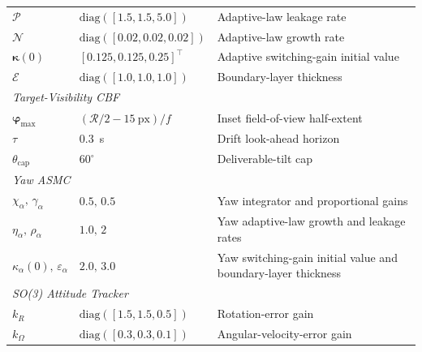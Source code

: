 \documentclass{IEEEtaes}
\begin{document}
\begin{table}[!t]
\begin{tabular}{p{} p{} p{}}
        $\mathcal{P}$           & $\text{diag}([1.5,1.5,5.0])$ & Adaptive-law leakage rate \\
        $\mathcal{N}$           & $\text{diag}([0.02,0.02,0.02])$ & Adaptive-law growth rate \\
        $\boldsymbol{\kappa}(0)$ & $[0.125,0.125,0.25]^\top$ & Adaptive switching-gain initial value \\
        $\mathcal{E}$           & $\text{diag}([1.0,1.0,1.0])$ & Boundary-layer thickness \\
    \midrule
        \multicolumn{3}{l}{\textit{Target-Visibility CBF}} \\
        $\boldsymbol{\varphi}_\text{max}$ & $(\mathcal{R}/2-15~\text{px})/f$ & Inset field-of-view half-extent \\
        $\tau$                      & $0.3$~s & Drift look-ahead horizon \\
        $\theta_\text{cap}$         & $60^\circ$ & Deliverable-tilt cap \\
    \midrule
        \multicolumn{3}{l}{\textit{Yaw ASMC}} \\
        $\chi_\alpha,\,\gamma_\alpha$       & $0.5,\,0.5$ & Yaw integrator and proportional gains \\
        $\eta_\alpha,\,\rho_\alpha$         & $1.0,\,2$ & Yaw adaptive-law growth and leakage rates \\
        $\kappa_{\alpha}(0),\,\varepsilon_\alpha$ & $2.0,\,3.0$ & Yaw switching-gain initial value and boundary-layer thickness \\
    \midrule
        \multicolumn{3}{l}{\textit{SO(3) Attitude Tracker}} \\
        $k_R$      & $\text{diag}([1.5,1.5,0.5])$ & Rotation-error gain \\
        $k_\Omega$ & $\text{diag}([0.3,0.3,0.1])$ & Angular-velocity-error gain \\
    \bottomrule
    \end{tabular}
\end{table}
\end{document}
